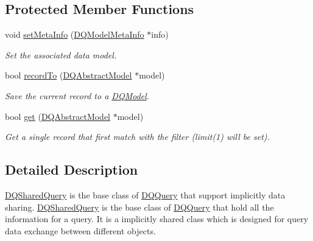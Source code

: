 \subsection*{Protected Member Functions}
\begin{DoxyCompactItemize}
\item 
\hypertarget{classDQSharedQuery_a18f2c23017b66343dbbfd0ffc3a171e7}{
void \hyperlink{classDQSharedQuery_a18f2c23017b66343dbbfd0ffc3a171e7}{setMetaInfo} (\hyperlink{classDQModelMetaInfo}{DQModelMetaInfo} $\ast$info)}
\label{classDQSharedQuery_a18f2c23017b66343dbbfd0ffc3a171e7}

\begin{DoxyCompactList}\small\item\em Set the associated data model. \item\end{DoxyCompactList}\item 
\hypertarget{classDQSharedQuery_a14865995b6d86072f3f69c8770d53d0b}{
bool \hyperlink{classDQSharedQuery_a14865995b6d86072f3f69c8770d53d0b}{recordTo} (\hyperlink{classDQAbstractModel}{DQAbstractModel} $\ast$model)}
\label{classDQSharedQuery_a14865995b6d86072f3f69c8770d53d0b}

\begin{DoxyCompactList}\small\item\em Save the current record to a \hyperlink{classDQModel}{DQModel}. \item\end{DoxyCompactList}\item 
bool \hyperlink{classDQSharedQuery_a62635ab0fa890f085fe2e02bd5d2064e}{get} (\hyperlink{classDQAbstractModel}{DQAbstractModel} $\ast$model)
\begin{DoxyCompactList}\small\item\em Get a single record that first match with the filter (limit(1) will be set). \item\end{DoxyCompactList}\end{DoxyCompactItemize}


\subsection{Detailed Description}
\hyperlink{classDQSharedQuery}{DQSharedQuery} is the base class of \hyperlink{classDQQuery}{DQQuery} that support implicitly data sharing. \hyperlink{classDQSharedQuery}{DQSharedQuery} is the base class of \hyperlink{classDQQuery}{DQQuery} that hold all the information for a query. It is a implicitly shared class which is designed for query data exchange between different objects.

